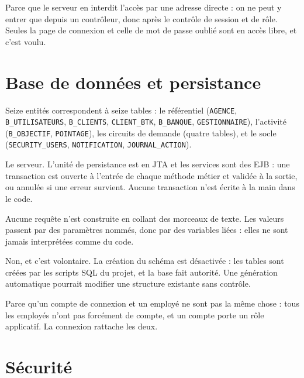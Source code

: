 \documentclass[a4paper,11pt]{article}
\begin{document}
Parce que le serveur en interdit l'accès par une adresse directe : on ne peut y
entrer que depuis un contrôleur, donc après le contrôle de session et de rôle.
Seules la page de connexion et celle de mot de passe oublié sont en accès libre,
et c'est voulu.

\section{Base de données et persistance}

Seize entités correspondent à seize tables : le référentiel
(\texttt{AGENCE}, \texttt{B\_UTILISATEURS}, \texttt{B\_CLIENTS},
\texttt{CLIENT\_BTK}, \texttt{B\_BANQUE}, \texttt{GESTIONNAIRE}), l'activité
(\texttt{B\_OBJECTIF}, \texttt{POINTAGE}), les circuits de demande (quatre
tables), et le socle (\texttt{SECURITY\_USERS}, \texttt{NOTIFICATION},
\texttt{JOURNAL\_ACTION}).

Le serveur. L'unité de persistance est en JTA et les services sont des EJB : une
transaction est ouverte à l'entrée de chaque méthode métier et validée à la
sortie, ou annulée si une erreur survient. Aucune transaction n'est écrite à la
main dans le code.

Aucune requête n'est construite en collant des morceaux de texte. Les valeurs
passent par des paramètres nommés, donc par des variables liées : elles ne sont
jamais interprétées comme du code.

Non, et c'est volontaire. La création du schéma est désactivée : les tables sont
créées par les scripts SQL du projet, et la base fait autorité. Une génération
automatique pourrait modifier une structure existante sans contrôle.

Parce qu'un compte de connexion et un employé ne sont pas la même chose : tous
les employés n'ont pas forcément de compte, et un compte porte un rôle
applicatif. La connexion rattache les deux.

\section{Sécurité}
\end{document}
